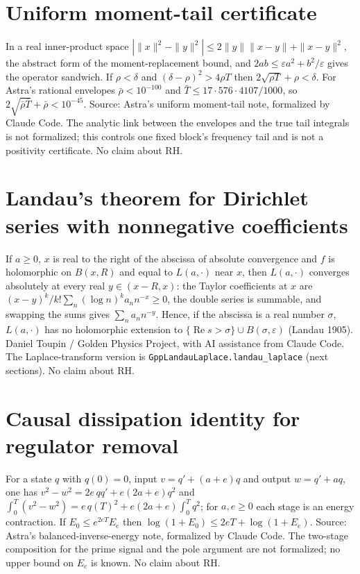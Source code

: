 \documentclass{report}
\theoremstyle{definition}
\begin{document}
\begin{itemize}
\begin{itemize}
\section{Uniform moment-tail certificate}
In a real inner-product space $|\|x\|^2-\|y\|^2|\le2\|y\|\|x-y\|+\|x-y\|^2$, the abstract form of the moment-replacement bound, and
$2ab\le\varepsilon a^2+b^2/\varepsilon$ gives the operator sandwich. If $\rho<\delta$ and $(\delta-\rho)^2>4\rho T$ then
$2\sqrt{\rho T}+\rho<\delta$. For Astra's rational envelopes $\bar\rho<10^{-100}$ and $\bar T\le17\cdot576\cdot4107/1000$, so
$2\sqrt{\bar\rho\bar T}+\bar\rho<10^{-45}$. Source: Astra's uniform moment-tail note, formalized by Claude Code. The analytic link between the
envelopes and the true tail integrals is not formalized; this controls one fixed block's frequency tail and is not a positivity
certificate. No claim about RH.

\section{Landau's theorem for Dirichlet series with nonnegative coefficients}
If $a\ge0$, $x$ is real to the right of the abscissa of absolute convergence and $f$ is holomorphic on $B(x,R)$ and equal to $L(a,\cdot)$
near $x$, then $L(a,\cdot)$ converges absolutely at every real $y\in(x-R,x)$: the Taylor coefficients at $x$ are
$(x-y)^k/k!\sum_n(\log n)^ka_nn^{-x}\ge0$, the double series is summable, and swapping the sums gives $\sum_na_nn^{-y}$. Hence, if the
abscissa is a real number $\sigma$, $L(a,\cdot)$ has no holomorphic extension to $\{\operatorname{Re}s>\sigma\}\cup B(\sigma,\varepsilon)$
(Landau 1905). Daniel Toupin / Golden Physics Project, with AI assistance from Claude Code. The Laplace-transform version is
\texttt{GppLandauLaplace.landau\_laplace} (next sections). No claim about RH.
\section{Causal dissipation identity for regulator removal}
For a state $q$ with $q(0)=0$, input $v=q'+(a+e)q$ and output $w=q'+aq$, one has $v^2-w^2=2e\,qq'+e(2a+e)q^2$ and
$\int_0^T(v^2-w^2)=e\,q(T)^2+e(2a+e)\int_0^Tq^2$; for $a,e\ge0$ each stage is an energy contraction. If $E_0\le e^{2eT}E_e$ then
$\log(1+E_0)\le2eT+\log(1+E_e)$. Source: Astra's balanced-inverse-energy note, formalized by Claude Code. The two-stage composition for the
prime signal and the pole argument are not formalized; no upper bound on $E_e$ is known. No claim about RH.


\end{itemize}
\end{itemize}
\end{document}
